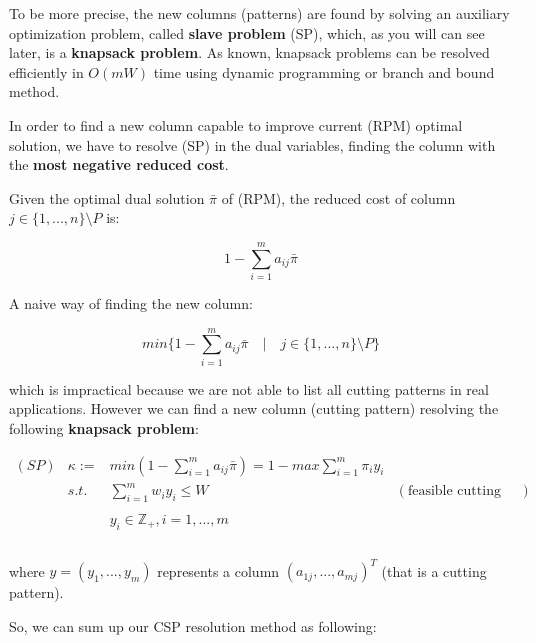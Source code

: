 \documentclass[10pt,a4paper]{article}
\begin{document}
To be more precise, the new columns (patterns) are found by solving an auxiliary optimization problem, called \textbf{slave problem} (SP), which, as you will can see later, is a \textbf{knapsack problem}. As known, knapsack problems can be resolved efficiently in $O(mW)$ time using dynamic programming or branch and bound method. 

In order to find a new column capable to improve current (RPM) optimal solution, we have to resolve (SP) in the dual variables, finding the column with the \textbf{most negative reduced cost}. 

Given the optimal dual solution $\bar{\pi}$ of (RPM), the reduced cost of column $j \in \lbrace 1,...,n \rbrace \setminus P$ is:

\begin{equation}
1 - \sum_{i=1}^m a_{ij} \bar{\pi}
\end{equation}

A naive way of finding the new column:

\begin{equation}
min \lbrace 1 - \sum_{i=1}^m a_{ij} \bar{\pi} \quad \vert \quad j \in \lbrace 1,...,n \rbrace \setminus P \rbrace
\end{equation}

which is impractical because we are not able to list all cutting patterns in real applications. However we can find a new column (cutting pattern) resolving the following \textbf{knapsack problem}:

\begin{equation}\label{eqn:SP}
\begin{array} {lllr} 
(SP) & \kappa := & \displaystyle min(1 - \sum_{i=1}^m a_{ij}\bar{\pi}) = 1 - max \sum_{i = 1}^{m} \pi_i y_i \\
& s.t. & \displaystyle\sum_{i = 1}^{m} w_i y_i \leq W & (\text{feasible cutting pattern}) \\\\
& & y_i \in \mathbb{Z}_{+}, i = 1,...,m  & \\\\
\end{array}
\end{equation}

where $y = (y_1,...,y_m)$ represents a column $(a_{1j},...,a_{mj})^T$ (that is a cutting pattern).

So, we can sum up our CSP resolution method as following:
\end{document}
